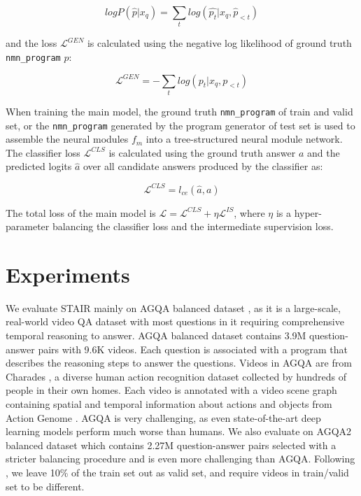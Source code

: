 \documentclass[letterpaper]{article} %
\begin{document}
\begin{equation}
logP(\hat{p}|x_q) = \sum_t log(\hat{p_t} | x_q, \hat{p}_{<t})
\end{equation}

and the loss $\mathcal{L}^{GEN}$ is calculated using the negative log likelihood of ground truth \texttt{nmn\_program} $p$:

\begin{equation}
\mathcal{L}^{GEN}=-\sum_t log(p_t| x_q, p_{<t})
\end{equation}

When training the main model, the ground truth \texttt{nmn\_program} of train and valid set, or the \texttt{nmn\_program} generated by the program generator of test set is used to assemble the neural modules ${f_m}$ into a tree-structured neural module network. The classifier loss $\mathcal{L}^{CLS}$ is calculated using the ground truth answer $a$ and the predicted logits $\hat{a}$ over all candidate answers produced by the classifier as:

\begin{equation}
\mathcal{L}^{CLS}=l_{ce}(\hat{a}, a)
\end{equation}

The total loss of the main model is $\mathcal{L}=\mathcal{L}^{CLS}+\eta \mathcal{L}^{IS}$, where $\eta$ is a hyper-parameter balancing the classifier loss and the intermediate supervision loss.


\section{Experiments}
We evaluate STAIR mainly on AGQA balanced dataset \cite{GrundeMcLaughlin2021AGQA}, as it is a large-scale, real-world video QA dataset with most questions in it requiring comprehensive temporal reasoning to answer. AGQA balanced dataset contains 3.9M question-answer pairs with 9.6K videos. Each question is associated with a program that describes the reasoning steps to answer the questions. Videos in AGQA are from Charades \cite{sigurdsson2016hollywood}, a diverse human action recognition dataset collected by hundreds of people in their own homes. Each video is annotated with a video scene graph containing spatial and temporal information about actions and objects from Action Genome \cite{Ji2019ActionGA}. AGQA is very challenging, as even state-of-the-art deep learning models perform much worse than humans. We also evaluate on AGQA2 balanced dataset \cite{GrundeMcLaughlin2022AGQA2} which contains 2.27M question-answer pairs selected with a stricter balancing procedure and is even more challenging than AGQA. Following \cite{Le2020HierarchicalCR}, we leave 10\% of the train set out as valid set, and require videos in train/valid set to be different.
\end{document}
